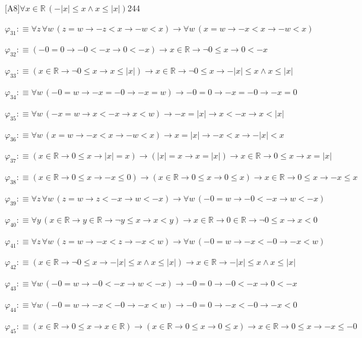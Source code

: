 \begin{fullproof}{[A8]}{$\forall x \in \mathbb{R}\,(-\lvert x \rvert \leq x \land x \leq \lvert x \rvert)$}{244}
\begin{abbrevlist}
\item $\varphi_{31} :\equiv \forall z\,\forall w\,(z = w \to -z < x \to -w < x) \to \forall w\,(x = w \to -x < x \to -w < x)$
\item $\varphi_{32} :\equiv (-0 = 0 \to -0 < -x \to 0 < -x) \to x \in \mathbb{R} \to \neg 0 \leq x \to 0 < -x$
\item $\varphi_{33} :\equiv (x \in \mathbb{R} \to \neg 0 \leq x \to x \leq \lvert x \rvert) \to x \in \mathbb{R} \to \neg 0 \leq x \to -\lvert x \rvert \leq x \land x \leq \lvert x \rvert$
\item $\varphi_{34} :\equiv \forall w\,(-0 = w \to -x = -0 \to -x = w) \to -0 = 0 \to -x = -0 \to -x = 0$
\item $\varphi_{35} :\equiv \forall w\,(-x = w \to x < -x \to x < w) \to -x = \lvert x \rvert \to x < -x \to x < \lvert x \rvert$
\item $\varphi_{36} :\equiv \forall w\,(x = w \to -x < x \to -w < x) \to x = \lvert x \rvert \to -x < x \to -\lvert x \rvert < x$
\item $\varphi_{37} :\equiv (x \in \mathbb{R} \to 0 \leq x \to \lvert x \rvert = x) \to (\lvert x \rvert = x \to x = \lvert x \rvert) \to x \in \mathbb{R} \to 0 \leq x \to x = \lvert x \rvert$
\item $\varphi_{38} :\equiv (x \in \mathbb{R} \to 0 \leq x \to -x \leq 0) \to (x \in \mathbb{R} \to 0 \leq x \to 0 \leq x) \to x \in \mathbb{R} \to 0 \leq x \to -x \leq x$
\item $\varphi_{39} :\equiv \forall z\,\forall w\,(z = w \to z < -x \to w < -x) \to \forall w\,(-0 = w \to -0 < -x \to w < -x)$
\item $\varphi_{40} :\equiv \forall y\,(x \in \mathbb{R} \to y \in \mathbb{R} \to \neg y \leq x \to x < y) \to x \in \mathbb{R} \to 0 \in \mathbb{R} \to \neg 0 \leq x \to x < 0$
\item $\varphi_{41} :\equiv \forall z\,\forall w\,(z = w \to -x < z \to -x < w) \to \forall w\,(-0 = w \to -x < -0 \to -x < w)$
\item $\varphi_{42} :\equiv (x \in \mathbb{R} \to \neg 0 \leq x \to -\lvert x \rvert \leq x \land x \leq \lvert x \rvert) \to x \in \mathbb{R} \to -\lvert x \rvert \leq x \land x \leq \lvert x \rvert$
\item $\varphi_{43} :\equiv \forall w\,(-0 = w \to -0 < -x \to w < -x) \to -0 = 0 \to -0 < -x \to 0 < -x$
\item $\varphi_{44} :\equiv \forall w\,(-0 = w \to -x < -0 \to -x < w) \to -0 = 0 \to -x < -0 \to -x < 0$
\item $\varphi_{45} :\equiv (x \in \mathbb{R} \to 0 \leq x \to x \in \mathbb{R}) \to (x \in \mathbb{R} \to 0 \leq x \to 0 \leq x) \to x \in \mathbb{R} \to 0 \leq x \to -x \leq -0$

\end{abbrevlist}
\end{fullproof}
